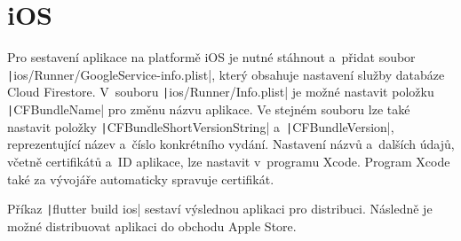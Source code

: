 \section{iOS}
 
Pro sestavení aplikace na platformě iOS je nutné stáhnout a~přidat soubor
\texttt|ios/Runner/GoogleService-info.plist|,
který obsahuje nastavení služby databáze Cloud Firestore.
V~souboru \texttt|ios/Runner/Info.plist|
je možné nastavit položku \texttt|CFBundleName|
pro změnu názvu aplikace.
Ve stejném souboru lze také nastavit položky
\texttt|CFBundleShortVersionString|
a~\texttt|CFBundleVersion|,
reprezentující název a~číslo konkrétního vydání.
Nastavení názvů a~dalších údajů,
včetně certifikátů a~ID aplikace,
lze nastavit v~programu Xcode.
Program Xcode také za vývojáře automaticky
spravuje certifikát.~\cite{flutter_deploy_ios}

Příkaz \texttt|flutter build ios| sestaví výslednou aplikaci
pro distribuci.
Následně je možné distribuovat aplikaci do obchodu Apple Store.
